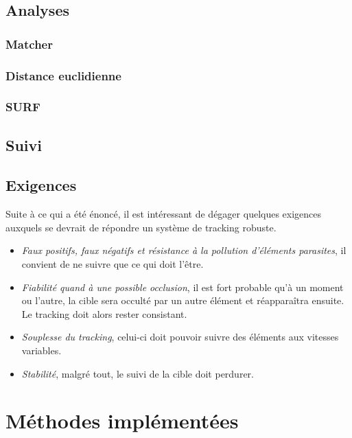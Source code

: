 \documentclass[a4paper,12pt]{report}
\begin{document}
\section{Analyses}
\subsection{Matcher}
\subsection{Distance euclidienne}
\subsection{SURF}

\section{Suivi}


\section{Exigences}
Suite à ce qui a été énoncé, il est intéressant de dégager quelques exigences auxquels se devrait de répondre un système de tracking robuste. 
\begin{itemize}
\item \textit{Faux positifs, faux négatifs et résistance à la pollution d'éléments parasites}, il convient de ne suivre que ce qui doit l'être.
\item \textit{Fiabilité quand à une possible occlusion}, il est fort probable qu'à un moment ou l'autre, la cible sera occulté par un autre élément et réapparaîtra ensuite. Le tracking doit alors rester consistant.
\item \textit{Souplesse du tracking}, celui-ci doit pouvoir suivre des éléments aux vitesses variables.
\item \textit{Stabilité}, malgré tout, le suivi de la cible doit perdurer.
\end{itemize}


\chapter{Méthodes implémentées}

\end{document}
